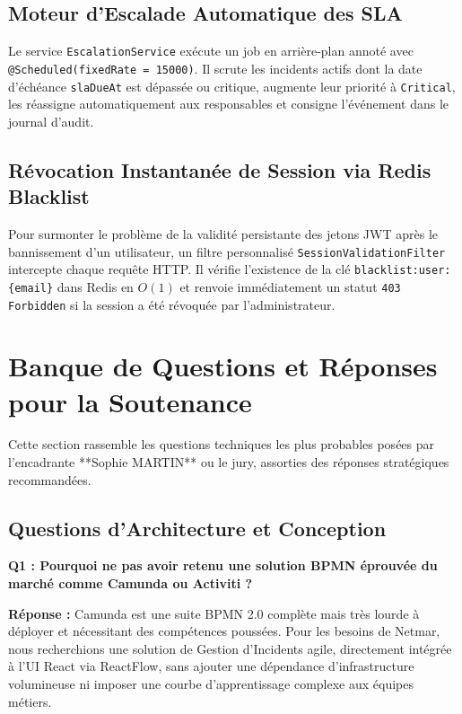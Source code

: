 \documentclass[12pt,a4paper]{article}
\begin{document}
\subsection{Moteur d'Escalade Automatique des SLA}
Le service \texttt{EscalationService} exécute un job en arrière-plan annoté avec \texttt{@Scheduled(fixedRate = 15000)}. Il scrute les incidents actifs dont la date d'échéance \texttt{slaDueAt} est dépassée ou critique, augmente leur priorité à \texttt{Critical}, les réassigne automatiquement aux responsables et consigne l'événement dans le journal d'audit.

\subsection{Révocation Instantanée de Session via Redis Blacklist}
Pour surmonter le problème de la validité persistante des jetons JWT après le bannissement d'un utilisateur, un filtre personnalisé \texttt{SessionValidationFilter} intercepte chaque requête HTTP. Il vérifie l'existence de la clé \texttt{blacklist:user:\{email\}} dans Redis en $O(1)$ et renvoie immédiatement un statut \texttt{403 Forbidden} si la session a été révoquée par l'administrateur.

\clearpage

\section{Banque de Questions et Réponses pour la Soutenance}

Cette section rassemble les questions techniques les plus probables posées par l'encadrante **Sophie MARTIN** ou le jury, assorties des réponses stratégiques recommandées.

\subsection{Questions d'Architecture et Conception}

\begin{mdframed}[backgroundcolor=lightbg, linecolor=primary, linewidth=1pt]
\textbf{Q1 : Pourquoi ne pas avoir retenu une solution BPMN éprouvée du marché comme Camunda ou Activiti ?}
\end{mdframed}
\textbf{Réponse :} Camunda est une suite BPMN 2.0 complète mais très lourde à déployer et nécessitant des compétences poussées. Pour les besoins de Netmar, nous recherchions une solution de Gestion d'Incidents agile, directement intégrée à l'UI React via ReactFlow, sans ajouter une dépendance d'infrastructure volumineuse ni imposer une courbe d'apprentissage complexe aux équipes métiers.
\end{document}
